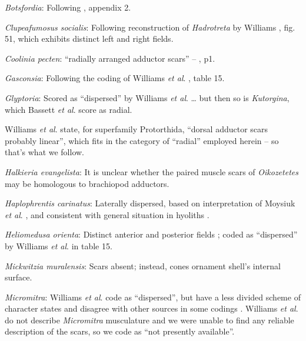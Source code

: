 \documentclass[openany]{book}
\theoremstyle{definition}
\theoremstyle{definition}
\theoremstyle{definition}
\theoremstyle{remark}
\begin{document}
\hypertarget{Botsfordia-coding-76}{}
\emph{Botsfordia}: Following \citet{Williams1998Thediversity}, appendix
2.

\hypertarget{Clupeafumosus_socialis-coding-76}{}
\emph{Clupeafumosus socialis}: Following reconstruction of
\emph{Hadrotreta} by Williams
\citeyearpar{Williams2000LinguliformeaCraniiformea}, fig. 51, which
exhibits distinct left and right fields.

\hypertarget{Coolinia_pecten-coding-76}{}
\emph{Coolinia pecten}: ``radially arranged adductor scars'' --
\citet{Bassett2017Earliestontogeny}, p1.

\hypertarget{Gasconsia-coding-76}{}
\emph{Gasconsia}: Following the coding of Williams \emph{et al}.
\citeyearpar{Williams2000LinguliformeaCraniiformea}, table 15.

\hypertarget{Glyptoria-coding-76}{}
\emph{Glyptoria}: Scored as ``dispersed'' by Williams \emph{et al}.
\citeyearpar{Williams1998Thediversity} \ldots{} but then so is
\emph{Kutorgina}, which Bassett \emph{et al}.
\citeyearpar{Bassett2001Functionalmorphology} score as radial.

Williams \emph{et al}.
\citeyearpar{Williams2000LinguliformeaCraniiformea} state, for
superfamily Protorthida, ``dorsal adductor scars probably linear'',
which fits in the category of ``radial'' employed herein -- so that's
what we follow.

\hypertarget{Halkieria_evangelista-coding-76}{}
\emph{Halkieria evangelista}: It is unclear whether the paired muscle
scars of \emph{Oikozetetes} may be homologous to brachiopod adductors.

\hypertarget{Haplophrentis_carinatus-coding-76}{}
\emph{Haplophrentis carinatus}: Laterally dispersed, based on
interpretation of Moysiuk \emph{et al}.
\citeyearpar{Moysiuk2017Hyolithsare}, and consistent with general
situation in hyoliths \citep[see][]{Dzik1980Ontogenyof}.

\hypertarget{Heliomedusa_orienta-coding-76}{}
\emph{Heliomedusa orienta}: Distinct anterior and posterior fields
\citep{Chen2007Reinterpretationof}; coded as ``dispersed'' by Williams
\emph{et al}. \citeyearpar{Williams2000LinguliformeaCraniiformea} in
table 15.

\hypertarget{Mickwitzia_muralensis-coding-76}{}
\emph{Mickwitzia muralensis}: Scars absent; instead, cones ornament
shell's internal surface.

\hypertarget{Micromitra-coding-76}{}
\emph{Micromitra}: Williams \emph{et al}.
\citeyearpar{Williams1998Thediversity} code as ``dispersed'', but have a
less divided scheme of character states and disagree with other sources
in some codings \citep[e.g.][in
Kutorginates]{Bassett2001Functionalmorphology}. Williams \emph{et al}.
\citeyearpar{Williams2000LinguliformeaCraniiformea} do not describe
\emph{Micromitra} musculature and we were unable to find any reliable
description of the scars, so we code as ``not presently available''.
\end{document}
